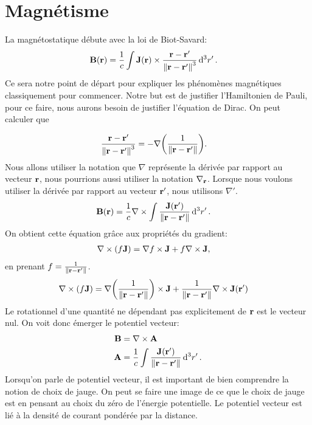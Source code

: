 \titleformat{\section}{
\normalfont\Large\bfseries{
  \color{\MasterColor}\titlerule[0.0pt]
  }
}{\thesection}{1em}{}

\section{Magnétisme} \label{sec: intro}

La magnétostatique débute avec la loi de Biot-Savard:
\begin{align}
    \vb{B}(\vb{r})&=\frac1c \int\vb{J}(\vb{r})\times\frac{\vb{r}-\vb{r}'}{\norm{\vb{r}-\vb{r}'}^3}\dd[3]{r'}.
\end{align}
Ce sera notre point de départ pour expliquer les phénomènes magnétiques classiquement
pour commencer. Notre but est de justifier l'Hamiltonien de Pauli, pour ce faire,
nous aurons besoin de justifier l'équation de Dirac.
On peut calculer que

\begin{align}
    \frac{\vb{r}-\vb{r'}}{\norm{\vb{r}-\vb{r}'}^3}&=-\nabla\qty(\frac{1}{\norm{\vb{r}-\vb{r'}}}).
\end{align}
Nous allons utiliser la notation que $\nabla$ représente la dérivée par rapport
au vecteur $\vb{r}$, nous pourrions aussi utiliser la notation $\nabla_{\vb{r}}$.
Lorsque nous voulons utiliser la dérivée par rapport au vecteur $\vb{r'}$, nous
utilisons $\nabla'$.
\begin{align}
    \vb{B}(\vb{r})&=\frac1c\nabla\times\int\frac{\vb{J}(\vb{r'})}{\norm{\vb{r}-\vb{r'}}}\dd[3]{r'}.
\end{align}
On obtient cette équation grâce aux propriétés du gradient:
\begin{align}
    \nabla\times(f\vb{J})&=\nabla f\times\vb{J}+f\nabla\times\vb{J},
\end{align}
en prenant $f=\frac1{\norm{\vb{r}-\vb{r'}}}$.
\begin{align}
    \nabla\times(f\vb{J})&=\nabla\qty(\frac1{\norm{\vb{r}-\vb{r'}}})\times\vb{J}
        +\frac1{\norm{\vb{r}-\vb{r'}}}\nabla\times\vb{J}(\vb{r'})
\end{align}
Le rotationnel d'une quantité ne dépendant pas explicitement de $\vb{r}$ est
le vecteur nul. On voit donc émerger le potentiel vecteur:
\begin{align}
    \vb{B}&=\nabla\times\vb{A}\\
    \vb{A}&=\frac1c\int\frac{\vb{J}(\vb{r'})}{\norm{\vb{r}-\vb{r'}}}\dd[3]{r'}.
\end{align}
Lorsqu'on parle de potentiel vecteur, il est important de bien comprendre la notion
de choix de jauge. On peut se faire une image de ce que le choix de jauge est
en pensant au choix du zéro de l'énergie potentielle. Le potentiel vecteur est
lié à la densité de courant pondérée par la distance.

